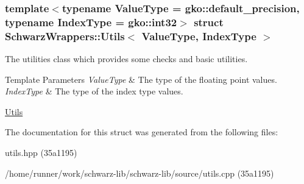\subsubsection*{template$<$typename Value\+Type = gko\+::default\+\_\+precision, typename Index\+Type = gko\+::int32$>$\newline
struct Schwarz\+Wrappers\+::\+Utils$<$ Value\+Type, Index\+Type $>$}

The utilities class which provides some checks and basic utilities. 


\begin{DoxyTemplParams}{Template Parameters}
{\em Value\+Type} & The type of the floating point values. \\
\hline
{\em Index\+Type} & The type of the index type values.\\
\hline
\end{DoxyTemplParams}
\hyperlink{group__utils}{Utils} 

The documentation for this struct was generated from the following files\+:\begin{DoxyCompactItemize}
\item 
utils.\+hpp (35a1195)\item 
/home/runner/work/schwarz-\/lib/schwarz-\/lib/source/utils.\+cpp (35a1195)\end{DoxyCompactItemize}
